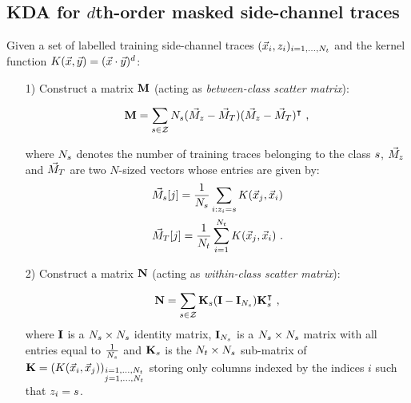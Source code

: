 \subsection{KDA for $d$th-order masked side-channel traces}\label{sec:KDA}
Given a set of labelled training side-channel traces $(\vLeakVec_i, \sensVar_i)_{i=1, \dots , \nbTrainingTraces}$ and the kernel function $K(\vLeakVec,\yyy)= (\vLeakVec \cdot \yyy)^d$:
\begin{itemize}

\item[1)] Construct a matrix $\MMM$ (acting as \emph{between-class scatter matrix}):

\begin{equation}
\MMM = \sum_{\sensVarGenValue\in\sensVarSet}\nbTracesPerClass(\MMMclass - \MMMT)(\MMMclass-\MMMT)^\intercal\mbox{ ,}
\end{equation}

where $\nbTracesPerClass$ denotes the number of training traces belonging to the class $\sensVarGenValue$,  $\MMMclass$ and $\MMMT$ are two $N$-sized vectors whose entries are given by:
\begin{align}
\MMMclass[\sensVarGenValue][j] = \frac{1}{\nbTracesPerClass}\sum_{i:\sensVar_i=\sensVarGenValue}K(\vLeakVec_j,\vLeakVec_i)\\
\MMMT[j] = \frac{1}{\nbTrainingTraces}\sum_{i=1}^{\nbTrainingTraces}K(\vLeakVec_{j},\vLeakVec_{i}) \mbox{ .}
\end{align}


\item[2)] Construct a matrix $\NNN$ (acting as \emph{within-class scatter matrix}):

\begin{equation}\label{eq:N}
\NNN = \sum_{\sensVarGenValue\in\sensVarSet}\kernelMatrix_\sensVarGenValue(\III - \III_{\nbTracesPerClass})\kernelMatrix_\sensVarGenValue^\intercal\mbox{ ,}
\end{equation}
where $\III$ is a $\nbTracesPerClass \times \nbTracesPerClass$ identity matrix, $\III_{\nbTracesPerClass}$ is a $\nbTracesPerClass \times \nbTracesPerClass$ matrix with all entries equal to $\frac{1}{\nbTracesPerClass}$ and $\kernelMatrix_{\sensVarGenValue}$ is the $\nbTrainingTraces \times \nbTracesPerClass$ sub-matrix of $\kernelMatrix = (K(\vLeakVec_i,\vLeakVec_j))_{\substack{i=1,\dots,\nbTrainingTraces \\ j=1,\dots,\nbTrainingTraces}}$ storing only columns indexed by the indices $i$ such that $\sensVar_i=\sensVarGenValue$. 


\end{itemize}
